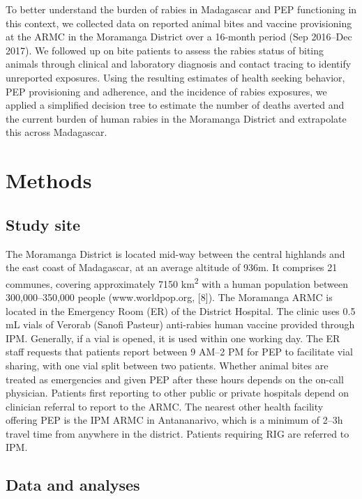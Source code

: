 \documentclass[
]{book}
\begin{document}
To better understand the burden of rabies in Madagascar and PEP functioning in this context, we collected data on reported animal bites and vaccine provisioning at the ARMC in the Moramanga District over a 16-month period (Sep 2016--Dec 2017). We followed up on bite patients to assess the rabies status of biting animals through clinical and laboratory diagnosis and contact tracing to identify unreported exposures. Using the resulting estimates of health seeking behavior, PEP provisioning and adherence, and the incidence of rabies exposures, we applied a simplified decision tree to estimate the number of deaths averted and the current burden of human rabies in the Moramanga District and extrapolate this across Madagascar.

\hypertarget{methods}{%
\section{Methods}\label{methods}}

\hypertarget{study-site}{%
\subsection{Study site}\label{study-site}}

The Moramanga District is located mid-way between the central highlands and the east coast of Madagascar, at an average altitude of 936m. It comprises 21 communes, covering approximately 7150 km\textsuperscript{2} with a human population between 300,000--350,000 people (www.worldpop.org, {[}8{]}). The Moramanga ARMC is located in the Emergency Room (ER) of the District Hospital. The clinic uses 0.5 mL vials of Verorab (Sanofi Pasteur) anti-rabies human vaccine provided through IPM. Generally, if a vial is opened, it is used within one working day. The ER staff requests that patients report between 9 AM--2 PM for PEP to facilitate vial sharing, with one vial split between two patients. Whether animal bites are treated as emergencies and given PEP after these hours depends on the on-call physician. Patients first reporting to other public or private hospitals depend on clinician referral to report to the ARMC. The nearest other health facility offering PEP is the IPM ARMC in Antananarivo, which is a minimum of 2--3h travel time from anywhere in the district. Patients requiring RIG are referred to IPM.

\hypertarget{data-and-analyses}{%
\subsection{Data and analyses}\label{data-and-analyses}}
\end{document}

